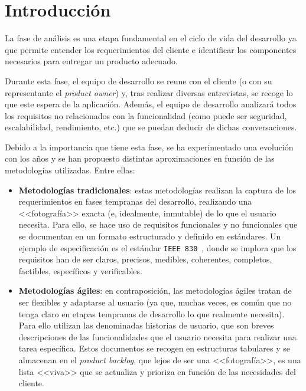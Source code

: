 \label{s:anexo-B}

\section{Introducción}

La fase de análisis es una etapa fundamental en el ciclo de vida del desarrollo ya que permite entender los requerimientos del cliente e identificar los componentes necesarios para entregar un producto adecuado.

Durante esta fase, el equipo de desarrollo se reune con el cliente (o con su representante el \textit{product owner}) y, tras realizar diversas entrevistas, se recoge lo que este espera de la aplicación. Además, el equipo de desarrollo analizará todos los requisitos no relacionados con la funcionalidad (como puede ser seguridad, escalabilidad, rendimiento, etc.) que se puedan deducir de dichas conversaciones.

Debido a la importancia que tiene esta fase, se ha experimentado una evolución con los años y se han propuesto distintas aproximaciones en función de las metodologías utilizadas. Entre ellas:

\begin{itemize}
	\item \textbf{Metodologías tradicionales}: estas metodologías realizan la captura de los requerimientos en fases tempranas del desarrollo, realizando una <<fotografía>> exacta (e, idealmente, inmutable) de lo que el usuario necesita. Para ello, se hace uso de requisitos funcionales y no funcionales que se documentan en un formato estructurado y definido en estándares. Un ejemplo de especificación es el estándar \texttt{IEEE 830}~\cite{ieee830}, donde se implora que los requisitos han de ser claros, precisos, medibles, coherentes, completos, factibles, específicos y verificables.
	
	\item  \textbf{Metodologías ágiles}: en contraposición, las metodologías ágiles tratan de ser flexibles y adaptarse al usuario (ya que, muchas veces, es común que no tenga claro en etapas tempranas de desarrollo lo que realmente necesita). Para ello utilizan las denominadas historias de usuario, que son breves descripciones de las funcionalidades que el usuario necesita para realizar una tarea específica. Estos documentos se recogen en estructuras tabulares y se almacenan en el \textit{product backlog}, que lejos de ser una <<fotografía>>, es una lista <<viva>> que se actualiza y prioriza en función de las necesidades del cliente. 
\end{itemize}


